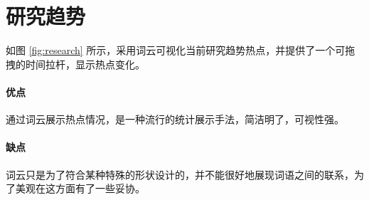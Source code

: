     \section{研究趋势}

    如图 \ref{fig:research} 所示，采用词云可视化当前研究趋势热点，并提供了一个可拖拽的时间拉杆，显示热点变化。

    \paragraph{优点} 通过词云展示热点情况，是一种流行的统计展示手法，简洁明了，可视性强。

    \paragraph{缺点} 词云只是为了符合某种特殊的形状设计的，并不能很好地展现词语之间的联系，为了美观在这方面有了一些妥协。
    
    \small
    